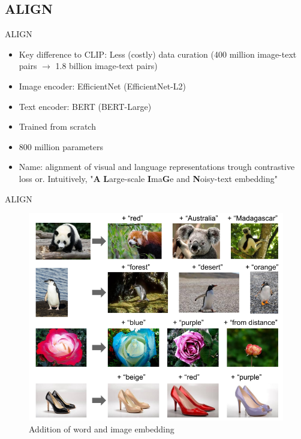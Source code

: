 \documentclass[xcolor=dvipsnames]{beamer}
\begin{document}
\subsection{ALIGN}
\begin{frame}{ALIGN \parencite{jia2021scaling}}
  \begin{itemize}
    \item Key difference to CLIP: Less (costly) data curation (400 million image-text pairs $\rightarrow$ 1.8 billion image-text pairs)
    \item Image encoder: EfficientNet (EfficientNet-L2)
    \item Text encoder: BERT (BERT-Large)  %
    \item Trained from scratch
    \item 800 million parameters \parencite{alford2021alignparams}
    \item Name: alignment of visual and language representations trough contrastive loss or. Intuitively, "\textbf{A} \textbf{L}arge-scale \textbf{I}ma\textbf{G}e and \textbf{N}oisy-text embedding"
  \end{itemize}
\end{frame}

\begin{frame}{ALIGN \parencite{jia2021scaling}}
  \begin{figure}[ht]
    \centering
    \includegraphics[width=0.7\linewidth]{../../figures/02-04-text-support-img/align-word-and-image-addition}
    \caption{Addition of word and image embedding}
  \end{figure}
\end{frame}
\end{document}
